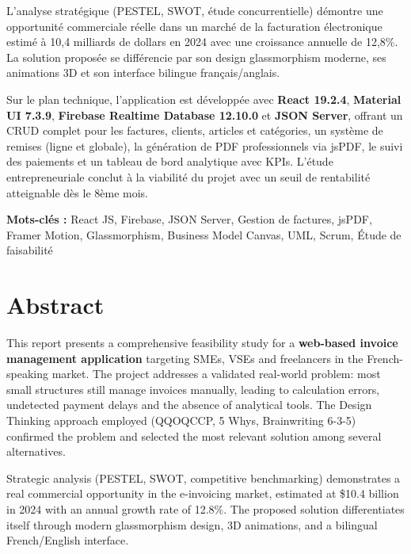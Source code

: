 \documentclass[12pt,a4paper]{report}
\begin{document}
L'analyse stratégique (PESTEL, SWOT, étude concurrentielle) démontre une opportunité commerciale réelle dans un marché de la facturation électronique estimé à 10,4 milliards de dollars en 2024 avec une croissance annuelle de 12,8\%. La solution proposée se différencie par son design glassmorphism moderne, ses animations 3D et son interface bilingue français/anglais.

Sur le plan technique, l'application est développée avec \textbf{React 19.2.4}, \textbf{Material UI 7.3.9}, \textbf{Firebase Realtime Database 12.10.0} et \textbf{JSON Server}, offrant un CRUD complet pour les factures, clients, articles et catégories, un système de remises (ligne et globale), la génération de PDF professionnels via jsPDF, le suivi des paiements et un tableau de bord analytique avec KPIs. L'étude entrepreneuriale conclut à la viabilité du projet avec un seuil de rentabilité atteignable dès le 8ème mois.

\textbf{Mots-clés :} React JS, Firebase, JSON Server, Gestion de factures, jsPDF, Framer Motion, Glassmorphism, Business Model Canvas, UML, Scrum, Étude de faisabilité

\clearpage
\chapter*{Abstract}

This report presents a comprehensive feasibility study for a \textbf{web-based invoice management application} targeting SMEs, VSEs and freelancers in the French-speaking market. The project addresses a validated real-world problem: most small structures still manage invoices manually, leading to calculation errors, undetected payment delays and the absence of analytical tools. The Design Thinking approach employed (QQOQCCP, 5 Whys, Brainwriting 6-3-5) confirmed the problem and selected the most relevant solution among several alternatives.

Strategic analysis (PESTEL, SWOT, competitive benchmarking) demonstrates a real commercial opportunity in the e-invoicing market, estimated at \$10.4 billion in 2024 with an annual growth rate of 12.8\%. The proposed solution differentiates itself through modern glassmorphism design, 3D animations, and a bilingual French/English interface.
\end{document}

